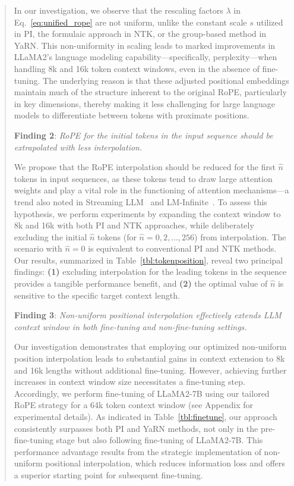 \begin{abstract}
In our investigation, we observe that the rescaling factors $\lambda$ in Eq.~\ref{eq:unified_rope} are not uniform, unlike the constant scale $s$ utilized in PI, the formulaic approach in NTK, or the group-based method in YaRN. This non-uniformity in scaling leads to marked improvements in LLaMA2’s language modeling capability—specifically, perplexity—when handling 8k and 16k token context windows, even in the absence of fine-tuning. The underlying reason is that these adjusted positional embeddings maintain much of the structure inherent to the original RoPE, particularly in key dimensions, thereby making it less challenging for large language models to differentiate between tokens with proximate positions.

\textbf{Finding 2}: \textit{RoPE for the initial tokens in the input sequence should be extrapolated with less interpolation.} 

We propose that the RoPE interpolation should be reduced for the first $\hat{n}$ tokens in input sequences, as these tokens tend to draw large attention weights and play a vital role in the functioning of attention mechanisms—a trend also noted in Streaming LLM~\cite{streamingllm} and LM-Infinite~\cite{han2023lminfinite}. To assess this hypothesis, we perform experiments by expanding the context window to 8k and 16k with both PI and NTK approaches, while deliberately excluding the initial $\hat n$ tokens (for $\hat n=0,2,...,256$) from interpolation. The scenario with $\hat n=0$ is equivalent to conventional PI and NTK methods. Our results, summarized in Table~\ref{tbl:tokenposition}, reveal two principal findings: \textbf{(1)} excluding interpolation for the leading tokens in the sequence provides a tangible performance benefit, and \textbf{(2)} the optimal value of $\hat n$ is sensitive to the specific target context length.

\textbf{Finding 3}: \textit{Non-uniform positional interpolation effectively extends LLM context window in both fine-tuning and non-fine-tuning settings.} 

Our investigation demonstrates that employing our optimized non-uniform position interpolation leads to substantial gains in context extension to 8k and 16k lengths without additional fine-tuning. However, achieving further increases in context window size necessitates a fine-tuning step. Accordingly, we perform fine-tuning of LLaMA2-7B using our tailored RoPE strategy for a 64k token context window (see Appendix for experimental details). As indicated in Table~\ref{tbl:finetune}, our approach consistently surpasses both PI and YaRN methods, not only in the pre-fine-tuning stage but also following fine-tuning of LLaMA2-7B. This performance advantage results from the strategic implementation of non-uniform positional interpolation, which reduces information loss and offers a superior starting point for subsequent fine-tuning.


\end{abstract}
